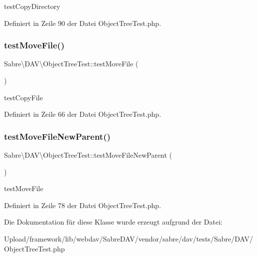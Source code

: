 test\+Copy\+Directory 

Definiert in Zeile 90 der Datei Object\+Tree\+Test.\+php.

\mbox{\label{class_sabre_1_1_d_a_v_1_1_object_tree_test_a2c358fa3632d69cc2cc969e3f14a3625}} 
\subsubsection{\texorpdfstring{test\+Move\+File()}{testMoveFile()}}
{\footnotesize\ttfamily Sabre\textbackslash{}\+D\+A\+V\textbackslash{}\+Object\+Tree\+Test\+::test\+Move\+File (\begin{DoxyParamCaption}{ }\end{DoxyParamCaption})}

test\+Copy\+File 

Definiert in Zeile 66 der Datei Object\+Tree\+Test.\+php.

\mbox{\label{class_sabre_1_1_d_a_v_1_1_object_tree_test_ad74ddfd003e4e4854e0ff8bfb9fa57ea}} 
\subsubsection{\texorpdfstring{test\+Move\+File\+New\+Parent()}{testMoveFileNewParent()}}
{\footnotesize\ttfamily Sabre\textbackslash{}\+D\+A\+V\textbackslash{}\+Object\+Tree\+Test\+::test\+Move\+File\+New\+Parent (\begin{DoxyParamCaption}{ }\end{DoxyParamCaption})}

test\+Move\+File 

Definiert in Zeile 78 der Datei Object\+Tree\+Test.\+php.



Die Dokumentation für diese Klasse wurde erzeugt aufgrund der Datei\+:\begin{DoxyCompactItemize}
\item 
Upload/framework/lib/webdav/\+Sabre\+D\+A\+V/vendor/sabre/dav/tests/\+Sabre/\+D\+A\+V/Object\+Tree\+Test.\+php\end{DoxyCompactItemize}
